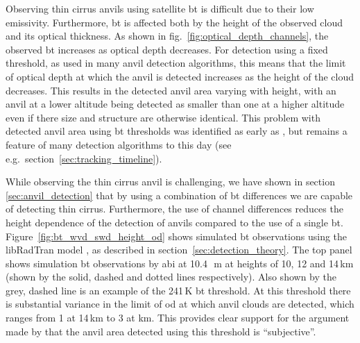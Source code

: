 Observing thin cirrus anvils using satellite \acrshort{bt} is difficult due to their low emissivity.
Furthermore, \acrshort{bt} is affected both by the height of the observed cloud and its optical thickness.
As shown in fig.~\ref{fig:optical_depth_channels}, the observed \acrshort{bt} increases as optical depth decreases.
For detection using a fixed threshold, as used in many anvil detection algorithms, this means that the limit of optical depth at which the anvil is detected increases as the height of the cloud decreases.
This results in the detected anvil area varying with height, with an anvil at a lower altitude being detected as smaller than one at a higher altitude even if there size and structure are otherwise identical.
This problem with detected anvil area using \acrshort{bt} thresholds was identified as early as \citet{augustine_mesoscale_1988}, but remains a feature of many detection algorithms to this day (see e.g.\ section~\ref{sec:tracking_timeline}).

While observing the thin cirrus anvil is challenging, we have shown in section \ref{sec:anvil_detection} that by using a combination of \acrshort{bt} differences we are capable of detecting thin cirrus.
Furthermore, the use of channel differences reduces the height dependence of the detection of anvils compared to the use of a single \acrshort{bt}.
Figure~\ref{fig:bt_wvd_swd_height_od} shows simulated \acrshort{bt} observations using the libRadTran model \citep{emde_libradtran_2016}, as described in section~\ref{sec:detection_theory}.
The top panel shows simulation \acrshort{bt} observations by \acrshort{abi} at 10.4\,\unit{\mu m} at heights of 10, 12 and 14\,\unit{km} (shown by the solid, dashed and dotted lines respectively).
Also shown by the grey, dashed line is an example of the 241\,\unit{K} \acrshort{bt} threshold.
At this threshold there is substantial variance in the limit of \acrshort{od} at which anvil clouds are detected, which ranges from 1 at 14\,\unit{km} to 3 at \unit{km}.
This provides clear support for the argument made by \citet{augustine_mesoscale_1988} that the anvil area detected using this threshold is ``subjective''.

